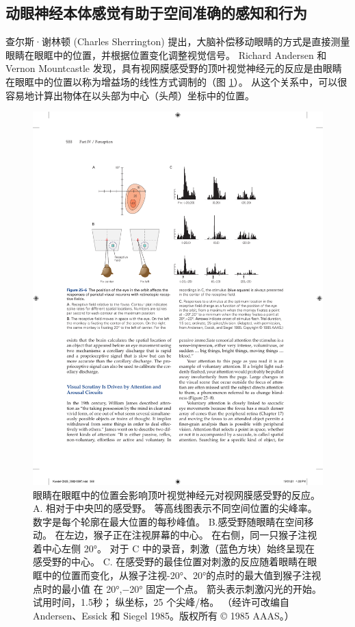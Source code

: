 \subsection{动眼神经本体感觉有助于空间准确的感知和行为}

查尔斯·谢林顿 (Charles Sherrington) 提出，大脑补偿移动眼睛的方式是直接测量眼睛在眼眶中的位置，并根据位置变化调整视觉信号。 Richard Andersen 和 Vernon Mountcastle 发现，具有视网膜感受野的顶叶视觉神经元的反应是由眼睛在眼眶中的位置以称为增益场的线性方式调制的（图 \ref{fig:25_6}）。 
从这个关系中，可以很容易地计算出物体在以头部为中心（头颅）坐标中的位置。


\begin{figure}[htbp]
	\centering
	\includegraphics[width=0.7\linewidth]{chap25/fig_25_6}
	\caption{眼睛在眼眶中的位置会影响顶叶视觉神经元对视网膜感受野的反应。 A. 相对于中央凹的感受野。 等高线图表示不同空间位置的尖峰率。 数字是每个轮廓在最大位置的每秒峰值。 B.感受野随眼睛在空间移动。 在左边，猴子正在注视屏幕的中心。 在右侧，同一只猴子注视着中心左侧 20°。 对于 C 中的录音，刺激（蓝色方块）始终呈现在感受野的中心。 C. 在感受野的最佳位置对刺激的反应随着眼睛在眼眶中的位置而变化，从猴子注视-20°、20°的点时的最大值到猴子注视点时的最小值 在 20°,−20° 固定一个点。 箭头表示刺激闪光的开始。 试用时间，1.5秒； 纵坐标，25 个尖峰/格。 （经许可改编自 Andersen、Essick 和 Siegel 1985。版权所有 © 1985 AAAS。）}
	\label{fig:25_6}
\end{figure}


